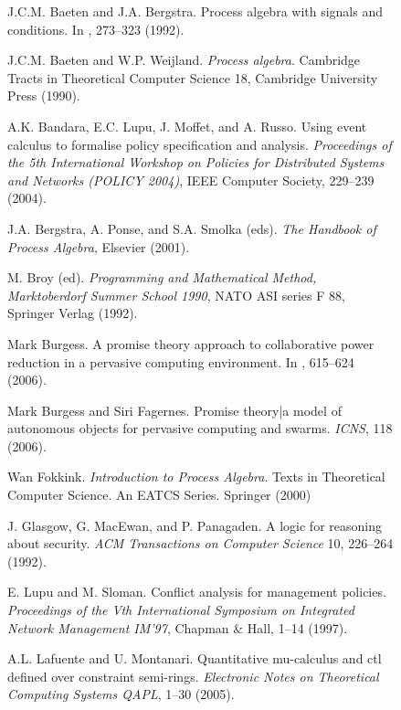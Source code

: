 \documentclass{pseudoelsart}
\begin{document}
\begin{figure}[htbp]
\begin{thebibliography}{99}

J.C.M. Baeten and J.A. Bergstra.
\newblock Process algebra with signals and conditions.
\newblock In \cite{B92}, 273--323 (1992).

J.C.M. Baeten and W.P. Weijland.
\newblock \emph{Process algebra}.
\newblock Cambridge Tracts in Theoretical Computer Science 18, Cambridge University Press (1990).

A.K. Bandara, E.C. Lupu, J. Moffet, and A. Russo.
\newblock Using event calculus to formalise policy specification and analysis.
\newblock \emph{Proceedings of the 5th International Workshop on Policies
for Distributed Systems and Networks (POLICY 2004)}, IEEE Computer Society, 229--239 (2004).
 
J.A. Bergstra, A. Ponse, and S.A. Smolka (eds).
\emph{The Handbook of Process Algebra}, Elsevier (2001).

M. Broy (ed).
\newblock \emph{Programming and Mathematical Method, Marktoberdorf Summer School 1990},
NATO ASI series F 88, Springer Verlag (1992).

Mark Burgess.
\newblock A promise theory approach to collaborative power reduction in a pervasive computing
environment.
\newblock In \cite{MJYT06}, 615--624 (2006).

Mark Burgess and Siri Fagernes.
\newblock Promise theory|a model of autonomous objects for pervasive computing and swarms.
\newblock \emph{ICNS}, 118 (2006).

Wan Fokkink.
\newblock \emph{Introduction to Process Algebra}.
\newblock Texts in Theoretical Computer Science. An EATCS Series. Springer (2000)

J. Glasgow, G. MacEwan, and P. Panagaden.
\newblock A logic for reasoning about security.
\newblock \emph{ACM Transactions on Computer Science} 10, 226--264 (1992).

E. Lupu and M. Sloman.
\newblock Conflict analysis for management policies.
\newblock \emph{Proceedings of the Vth International Symposium on Integrated
Network Management IM'97}, Chapman \& Hall, 1--14 (1997).

A.L. Lafuente and U. Montanari.
\newblock Quantitative mu-calculus and ctl defined over constraint semi-rings.
\newblock \emph{Electronic Notes on Theoretical Computing Systems QAPL}, 
1--30 (2005).


\end{thebibliography}
\end{figure}
\end{document}
